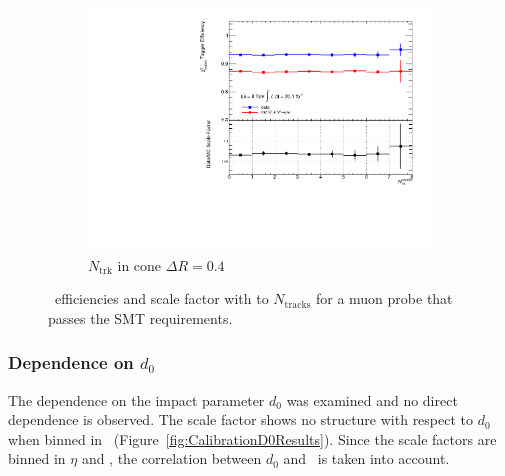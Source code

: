 \begin{figure}[htbp]
    \begin{subfigure}[b]{0.54\textwidth}
      \includegraphics[width=\textwidth]{PartCalibration2012/Plots/SFPlots/nucone40_smt.pdf}
      \caption{$N_{\textrm{trk}}$ in cone $\Delta R=0.4$} \label{fig:CalibrationIsoNucone40}
    \end{subfigure}
  \caption{\xsd\ efficiencies and scale factor with to $N_{\textrm{tracks}}$ for a muon probe that passes the SMT requirements.} \label{fig:CalibrationIsoNucone}
\end{figure}

\subsubsection*{Dependence on $d_{0}$}

The dependence on the impact parameter $d_{0}$ was examined and no direct dependence is observed. The scale factor shows no structure with respect to $d_{0}$ when binned in \pt\ (Figure~\ref{fig:CalibrationD0Results}). Since the scale factors are binned in $\eta$ and \pt, the correlation between $d_{0}$ and \pt\ is taken into account.

